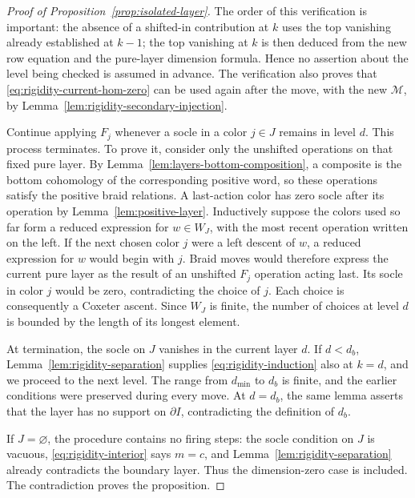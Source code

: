 \begin{proof}[Proof of Proposition~\ref{prop:isolated-layer}]
The order of this verification is important: the absence of a shifted-in
contribution at $k$ uses the top vanishing already established at $k-1$;
the top vanishing at $k$ is then deduced from the new row equation and the
pure-layer dimension formula.  Hence no assertion about the level being
checked is assumed in advance.  The verification also proves that
\eqref{eq:rigidity-current-hom-zero} can be used again after the move,
with the new $\mathcal M$, by
Lemma~\ref{lem:rigidity-secondary-injection}.

Continue applying $F_j$ whenever a socle in a color $j\in J$ remains in
level $d$.  This process terminates.  To prove it, consider only the
unshifted operations on that fixed pure layer.  By
Lemma~\ref{lem:layers-bottom-composition}, a composite is the bottom
cohomology of the corresponding positive word, so these operations
satisfy the positive braid relations.  A last-action color has zero
socle after its operation by Lemma~\ref{lem:positive-layer}.
Inductively suppose the colors used so far form a reduced expression
for $w\in W_J$, with the most recent operation written on the left.  If
the next chosen color $j$ were a left descent of $w$, a reduced
expression for $w$ would begin with $j$.  Braid moves would therefore
express the current pure layer as the result of an unshifted $F_j$
operation acting last.  Its socle in color $j$ would be zero,
contradicting the choice of $j$.  Each choice is consequently a Coxeter
ascent.  Since $W_J$ is finite, the number of choices at level $d$ is
bounded by the length of its longest element.

At termination, the socle on $J$ vanishes in the current layer $d$.
If $d<d_b$, Lemma~\ref{lem:rigidity-separation} supplies
\eqref{eq:rigidity-induction} also at $k=d$, and we proceed to the next
level.  The range from $d_{\min}$ to $d_b$ is finite, and the earlier
conditions were preserved during every move.  At $d=d_b$, the same
lemma asserts that the layer has no support on $\partial I$, contradicting
the definition of $d_b$.

If $J=\varnothing$, the procedure contains no firing steps: the socle
condition on $J$ is vacuous, \eqref{eq:rigidity-interior} says $m=c$, and
Lemma~\ref{lem:rigidity-separation} already contradicts the boundary
layer.  Thus the dimension-zero case is included.  The contradiction
proves the proposition.
\end{proof}
